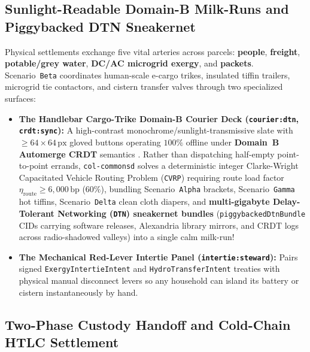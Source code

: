 \subsection{Sunlight-Readable Domain-B Milk-Runs and Piggybacked DTN Sneakernet}

Physical settlements exchange five vital arteries across parcels: \textbf{people}, \textbf{freight}, \textbf{potable/grey water}, \textbf{DC/AC microgrid exergy}, and \textbf{packets}. Scenario~\texttt{Beta} coordinates human-scale e-cargo trikes, insulated tiffin trailers, microgrid tie contactors, and cistern transfer valves through two specialized surfaces:
\begin{itemize}
    \item \textbf{The Handlebar Cargo-Trike Domain-B Courier Deck (\texttt{courier:dtn}, \texttt{crdt:sync}):} A high-contrast monochrome/sunlight-transmissive slate with $\ge 64 \times 64\,\mathrm{px}$ gloved buttons operating $100\%$ offline under \textbf{Domain~B Automerge CRDT} semantics \parencite{kleppmann2017automerge,fall2003}. Rather than dispatching half-empty point-to-point errands, \texttt{col-commonsd} solves a deterministic integer Clarke-Wright Capacitated Vehicle Routing Problem (\texttt{CVRP}) requiring route load factor $\eta_{\mathrm{route}} \ge 6{,}000\,\mathrm{bp}$ ($60\%$), bundling Scenario~\texttt{Alpha} brackets, Scenario~\texttt{Gamma} hot tiffins, Scenario~\texttt{Delta} clean cloth diapers, and \textbf{multi-gigabyte Delay-Tolerant Networking (\texttt{DTN}) sneakernet bundles} (\texttt{piggybackedDtnBundle} CIDs carrying software releases, Alexandria library mirrors, and CRDT logs across radio-shadowed valleys) into a single calm milk-run!
    \item \textbf{The Mechanical Red-Lever Intertie Panel (\texttt{intertie:steward}):} Pairs signed \texttt{ExergyIntertieIntent} and \texttt{HydroTransferIntent} treaties with physical manual disconnect levers so any household can island its battery or cistern instantaneously by hand.
\end{itemize}

\subsection{Two-Phase Custody Handoff and Cold-Chain HTLC Settlement}


